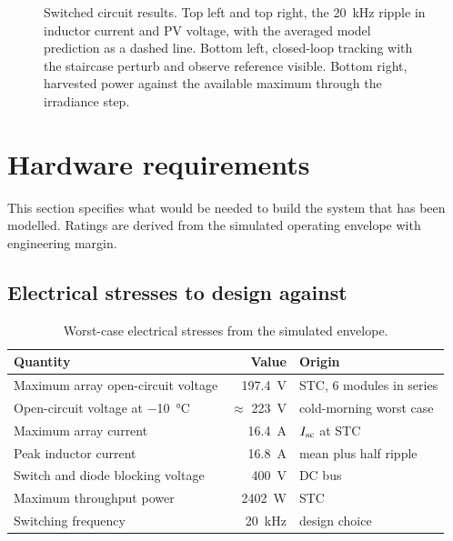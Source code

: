 \begin{figure}[htbp]
\centering
{}
\caption[Switched circuit validation]{Switched circuit results. Top left and top right, the \SI{20}{\kilo\hertz} ripple in inductor current and PV voltage, with the averaged model prediction as a dashed line. Bottom left, closed-loop tracking with the staircase perturb and observe reference visible. Bottom right, harvested power against the available maximum through the irradiance step.}
\label{fig:swvalid}
\end{figure}

\section{Hardware requirements}

This section specifies what would be needed to build the system that has been
modelled. Ratings are derived from the simulated operating envelope with
engineering margin.

\subsection{Electrical stresses to design against}

\begin{table}[htbp]
\centering
\caption{Worst-case electrical stresses from the simulated envelope.}
\label{tab:stress}
\begin{tabular}{@{}L{0.40\textwidth}rl@{}}
\toprule
\textbf{Quantity} & \textbf{Value} & \textbf{Origin} \\
\midrule
Maximum array open-circuit voltage & \SI{197.4}{\volt} & STC, 6 modules in series \\
Open-circuit voltage at \SI{-10}{\celsius} & $\approx$ \SI{223}{\volt} & cold-morning worst case \\
Maximum array current & \SI{16.4}{\ampere} & $I_{\mathrm{sc}}$ at STC \\
Peak inductor current & \SI{16.8}{\ampere} & mean plus half ripple \\
Switch and diode blocking voltage & \SI{400}{\volt} & DC bus \\
Maximum throughput power & \SI{2402}{\watt} & STC \\
Switching frequency & \SI{20}{\kilo\hertz} & design choice \\
\bottomrule
\end{tabular}
\end{table}

